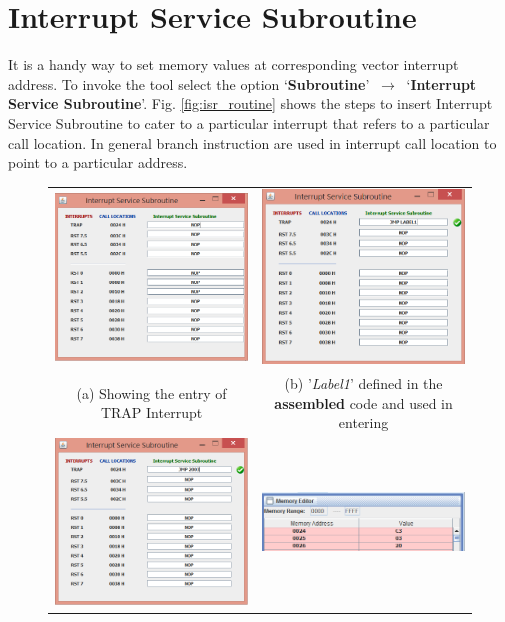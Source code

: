 \newpage
\section{Interrupt Service Subroutine}
It is a handy way to set memory values at corresponding vector interrupt address.
To invoke the tool select the option `\textbf{Subroutine}' $~ \rightarrow ~$ `\textbf{Interrupt Service Subroutine}'. Fig. \ref{fig:isr_routine} shows the steps to insert Interrupt Service Subroutine to cater to a particular interrupt that refers to a particular call location. In general branch instruction are used in interrupt call location to point to a particular address. 
\begin{figure}[htbp]
	\centering
	{\def\arraystretch{2}
	\begin{tabular}{cc}
			\includegraphics[width=0.5\linewidth]{isr_nop} & \includegraphics[width=0.5\linewidth]{isr_label}\\
			(a) Showing the entry of TRAP Interrupt & (b) '\textit{Label1}' defined in the \textbf{assembled} code and used in entering\\
			\includegraphics[width=0.5\linewidth]{isr_label_autofill} & \includegraphics[width=0.5\linewidth]{isr_memory}\\

\end{tabular}}
\end{figure}
